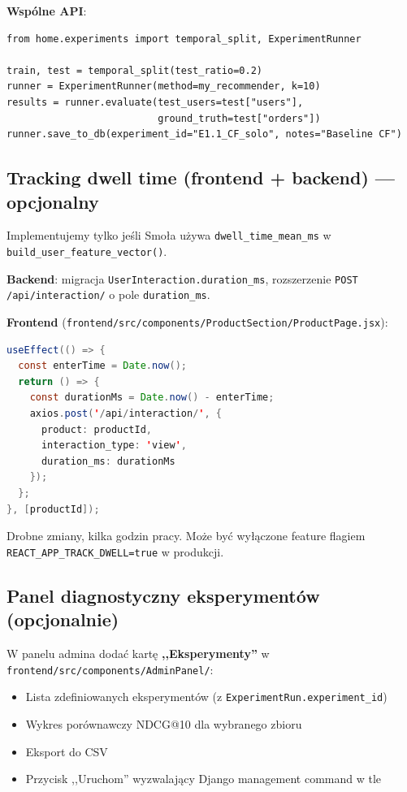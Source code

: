 \documentclass[a4paper,11pt]{article}
\newcommand{\code}[1]{\texttt{\small #1}}
\begin{document}
\textbf{Wspólne API}:

\begin{lstlisting}
from home.experiments import temporal_split, ExperimentRunner

train, test = temporal_split(test_ratio=0.2)
runner = ExperimentRunner(method=my_recommender, k=10)
results = runner.evaluate(test_users=test["users"],
                          ground_truth=test["orders"])
runner.save_to_db(experiment_id="E1.1_CF_solo", notes="Baseline CF")
\end{lstlisting}

\subsection{Tracking dwell time (frontend + backend) --- opcjonalny}

Implementujemy tylko jeśli Smoła używa \code{dwell\_time\_mean\_ms} w \code{build\_user\_feature\_vector()}.

\textbf{Backend}: migracja \code{UserInteraction.duration\_ms}, rozszerzenie \code{POST /api/interaction/} o pole \code{duration\_ms}.

\textbf{Frontend} (\code{frontend/src/components/ProductSection/ProductPage.jsx}):

\begin{lstlisting}[language=Java]
useEffect(() => {
  const enterTime = Date.now();
  return () => {
    const durationMs = Date.now() - enterTime;
    axios.post('/api/interaction/', {
      product: productId,
      interaction_type: 'view',
      duration_ms: durationMs
    });
  };
}, [productId]);
\end{lstlisting}

Drobne zmiany, kilka godzin pracy. Może być wyłączone feature flagiem \code{REACT\_APP\_TRACK\_DWELL=true} w produkcji.

\subsection{Panel diagnostyczny eksperymentów (opcjonalnie)}

W panelu admina dodać kartę \textbf{,,Eksperymenty''} w \code{frontend/src/components/AdminPanel/}:

\begin{itemize}[leftmargin=1.5em,itemsep=2pt]
  \item Lista zdefiniowanych eksperymentów (z \code{ExperimentRun.experiment\_id})
  \item Wykres porównawczy NDCG@10 dla wybranego zbioru
  \item Eksport do CSV
  \item Przycisk ,,Uruchom'' wyzwalający Django management command w tle
\end{itemize}
\end{document}
